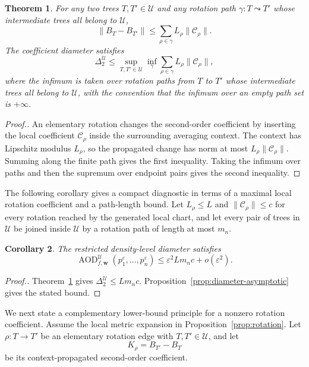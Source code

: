 \documentclass[11pt]{article}
\theoremstyle{plain}
\newtheorem{theorem}{Theorem}
\newtheorem{corollary}[theorem]{Corollary}
\theoremstyle{definition}
\theoremstyle{definition}
\newcommand{\AOD}{\operatorname{AOD}}
\newcommand{\eps}{\varepsilon}
\newcommand{\Curv}{\mathcal C}
\newcommand{\wv}{\mathbf w}
\newcommand{\AODfw}{\AOD_{f,\wv}}
\begin{document}
\begin{theorem}\label{thm:rotation-bound}
For any two trees $T,T'\in\mathcal U$ and any rotation path $\gamma:T\leadsto T'$ whose intermediate trees all belong to $\mathcal U$,
\[
\|B_T-B_{T'}\|\le \sum_{\rho\in\gamma}L_\rho\|\Curv_\rho\|.
\]
The coefficient diameter satisfies
\[
\Delta_2^{\mathcal U}\le \sup_{T,T'\in\mathcal U}\inf_{\gamma}\sum_{\rho\in\gamma}L_\rho\|\Curv_\rho\|,
\]
where the infimum is taken over rotation paths from $T$ to $T'$ whose intermediate trees all belong to $\mathcal U$, with the convention that the infimum over an empty path set is $+\infty$.
\end{theorem}

\begin{proof}[Proof.]
An elementary rotation changes the second-order coefficient by inserting the local coefficient $\Curv_\rho$ inside the surrounding averaging context. The context has Lipschitz modulus $L_\rho$, so the propagated change has norm at most $L_\rho\|\Curv_\rho\|$. Summing along the finite path gives the first inequality. Taking the infimum over paths and then the supremum over endpoint pairs gives the second inequality.
\end{proof}

The following corollary gives a compact diagnostic in terms of a maximal local rotation coefficient and a path-length bound. Let $L_\rho\le L$ and $\|\Curv_\rho\|\le c$ for every rotation reached by the generated local chart, and let every pair of trees in $\mathcal U$ be joined inside $\mathcal U$ by a rotation path of length at most $m_n$.

\begin{corollary}\label{cor:global-bound}
The restricted density-level diameter satisfies
\[
\AODfw^{\mathcal U}(p_1^\eps,\ldots,p_n^\eps)\le \eps^2Lm_nc+o(\eps^2).
\]
\end{corollary}

\begin{proof}[Proof.]
Theorem~\ref{thm:rotation-bound} gives $\Delta_2^{\mathcal U}\le Lm_nc$. Proposition~\ref{prop:diameter-asymptotic} gives the stated bound.
\end{proof}

We next state a complementary lower-bound principle for a nonzero rotation coefficient. Assume the local metric expansion in Proposition~\ref{prop:rotation}. Let $\rho:T\to T'$ be an elementary rotation edge with $T,T'\in\mathcal U$, and let
\[
K_\rho=B_{T'}-B_T
\]
be its context-propagated second-order coefficient.
\end{document}
